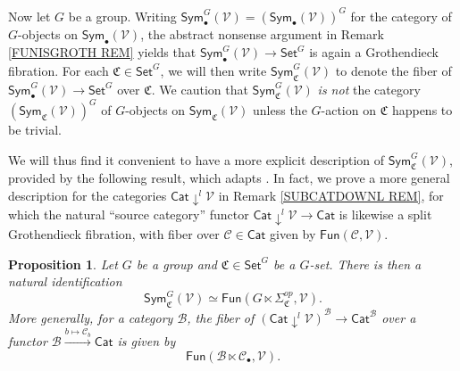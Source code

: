 \documentclass[a4paper,10pt
,draft
]{article}%
\numberwithin{equation}{section}
\numberwithin{figure}{section}
\newtheorem{proposition}[equation]{Proposition}%
\theoremstyle{definition} %
\newcommand{\V}{\ensuremath{\mathcal V}}
\newcommand{\1}{\ensuremath{\mathbbm 1}}%
\begin{document}
Now let $G$ be a group. Writing 
$\mathsf{Sym}^G_\bullet(\mathcal{V})
=
\left(\mathsf{Sym}_\bullet(\mathcal{V})\right)^G$
for the category of $G$-objects
on $\mathsf{Sym}_{\bullet}(\V)$,
the abstract nonsense argument in Remark \ref{FUNISGROTH REM}
yields that
$\mathsf{Sym}^G_\bullet(\mathcal{V}) \to \mathsf{Set}^G$
is again a Grothendieck fibration.
For each $\mathfrak{C} \in \mathsf{Set}^G$,
we will then write
$\mathsf{Sym}^G_{\mathfrak{C}}(\V)$
to denote the fiber of
$\mathsf{Sym}^G_\bullet(\mathcal{V}) \to \mathsf{Set}^G$
over $\mathfrak{C}$.
We caution that 
$\mathsf{Sym}^G_{\mathfrak{C}}(\V)$
\emph{is not} the category 
$\left(\mathsf{Sym}_{\mathfrak{C}}(\V)\right)^G$
of $G$-objects on $\mathsf{Sym}_{\mathfrak{C}}(\V)$
unless the $G$-action on $\mathfrak{C}$
happens to be trivial.

We will thus find it convenient to have a more explicit description of
$\mathsf{Sym}^G_{\mathfrak{C}}(\V)$,
provided by the following result, 
which adapts
\cite[Lemma A.6]{BP_geo}.
In fact, we prove a more general description
for the categories $\mathsf{Cat} \downarrow^l \mathcal{V}$
in Remark \ref{SUBCATDOWNL REM},
for which the natural ``source category'' functor
$\mathsf{Cat} \downarrow^l \mathcal{V} \to \mathsf{Cat}$
is likewise a split Grothendieck fibration,
with fiber over $\mathcal{C} \in \mathsf{Cat}$
given by $\mathsf{Fun}(\mathcal{C},\mathcal{V})$.



\begin{proposition}\label{EQUIVFNCON PROP}
	Let $G$ be a group and $\mathfrak{C} \in \mathsf{Set}^G$
	be a $G$-set. There is then a natural identification
	\[
	\mathsf{Sym}^G_{\mathfrak{C}}(\V)
	\simeq
	\mathsf{Fun}(G \ltimes \Sigma^{op}_{\mathfrak{C}},\V).
	\]
	More generally, for a category $\mathcal{B}$,
	the fiber of
	$\left(\mathsf{Cat} \downarrow^l \V \right)^{\mathcal{B}}
	\to \mathsf{Cat}^{\mathcal{B}}$
	over a functor
	$\mathcal{B} \xrightarrow{b \mapsto \mathcal{C}_b} \mathsf{Cat}$
	is given by
	\begin{equation}\label{FUNBLTICV EQ}
	\mathsf{Fun}(\mathcal{B} \ltimes \mathcal{C}_{\bullet},\V).
	\end{equation}
\end{proposition}
\end{document}
